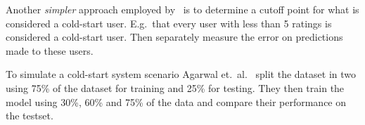 Another \emph{simpler} approach employed by~\cite{Massa2007, Jamali2009} is to
determine a cutoff point for what is considered a cold-start user. E.g.\ that
every user with less than 5 ratings is considered a cold-start user. Then
separately measure the error on predictions made to these users.

To simulate a cold-start system scenario Agarwal et.\ al.~\cite{Agarwal2009}
split the dataset in two using 75\% of the dataset for training and 25\% for
testing. They then train the model using 30\%, 60\% and 75\% of the data and
compare their performance on the testset.






